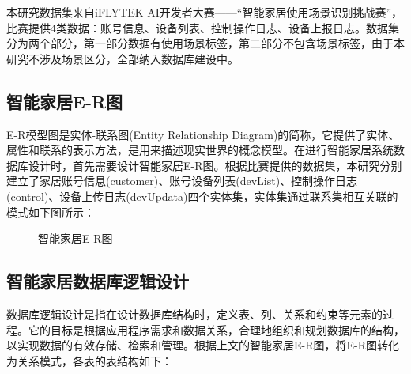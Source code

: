 \begin{CJK*}{UTF8}{song}

本研究数据集来自iFLYTEK AI开发者大赛——“智能家居使用场景识别挑战赛”，比赛提供4类数据：账号信息、设备列表、控制操作日志、设备上报日志。数据集分为两个部分，第一部分数据有使用场景标签，第二部分不包含场景标签，由于本研究不涉及场景区分，全部纳入数据库建设中。

{\begin{CJK*}{UTF8}{zhhei}\vskip 1mm\subsection{智能家居E-R图}\end{CJK*}}
E-R模型图是实体-联系图(Entity Relationship Diagram)的简称，它提供了实体、属性和联系的表示方法，是用来描述现实世界的概念模型。在进行智能家居系统数据库设计时，首先需要设计智能家居E-R图。根据比赛提供的数据集，本研究分别建立了家居账号信息(customer)、账号设备列表(devList)、控制操作日志(control)、设备上传日志(devUpdata)四个实体集，实体集通过联系集相互关联的模式如下图所示：
\begin{figure}[H] %
  \raggedright %
  \caption{智能家居E-R图}
  \label{fig:smart_home_ER}
\end{figure}

{\begin{CJK*}{UTF8}{zhhei}\subsection{智能家居数据库逻辑设计}\end{CJK*}}

数据库逻辑设计是指在设计数据库结构时，定义表、列、关系和约束等元素的过程。它的目标是根据应用程序需求和数据关系，合理地组织和规划数据库的结构，以实现数据的有效存储、检索和管理。根据上文的智能家居E-R图，将E-R图转化为关系模式，各表的表结构如下：

\begin{enumerate}


\end{enumerate}
\end{CJK*}
